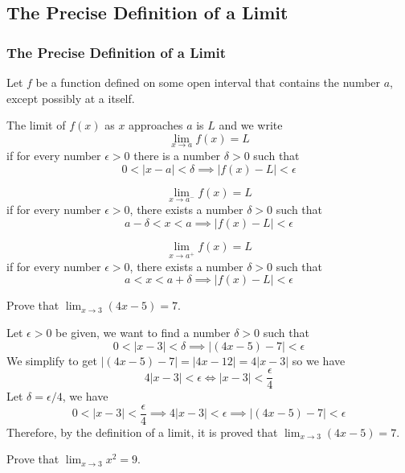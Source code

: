 \subsection{The Precise Definition of a Limit}

\subsubsection{The Precise Definition of a Limit}
Let \(f\) be a function defined on some open interval that contains the number
\(a\), except possibly at a itself.
\begin{definition}
    The limit of \(f(x)\) as \(x\) approaches \(a\) is \(L\) and we write
    \[\lim_{x\to a}f(x)=L\]
    if for every number \(\epsilon>0\) there is a number \(\delta>0\) such that
    \[0<|x-a|<\delta\implies|f(x)-L|<\epsilon\]
\end{definition}
\begin{definition}
    \[\lim_{x\to a^-}f(x)=L\] if for every number \(\epsilon>0\), there exists
    a number \(\delta>0\) such that
    \[a-\delta<x<a\implies|f(x)-L|<\epsilon\]
\end{definition}
\begin{definition}
    \[\lim_{x\to a^+}f(x)=L\] if for every number \(\epsilon>0\), there exists
    a number \(\delta>0\) such that
    \[a<x<a+\delta\implies|f(x)-L|<\epsilon\]
\end{definition}
\begin{problem}
    Prove that \(\displaystyle{\lim_{x\to 3}(4x-5)=7}\).
\end{problem}
\begin{solution}
    Let \(\epsilon>0\) be given, we want to find a number \(\delta>0\) such
    that
    \[0<|x-3|<\delta \implies|(4x-5)-7|<\epsilon\]
    We simplify to get \(|(4x-5)-7|=|4x-12|=4|x-3|\) so we have
    \[4|x-3|<\epsilon\iff|x-3|<\frac{\epsilon}{4}\]
    Let \(\delta=\epsilon/4\), we have
    \[0<|x-3|<\frac{\epsilon}{4}\implies4|x-3|<\epsilon\implies
    |(4x-5)-7|<\epsilon\]
    Therefore, by the definition of a limit, it is proved that
    \(\lim_{x\to 3}(4x-5)=7\).
\end{solution}
\begin{problem}
    Prove that \(\displaystyle{\lim_{x\to 3}x^2=9}\).
\end{problem}
